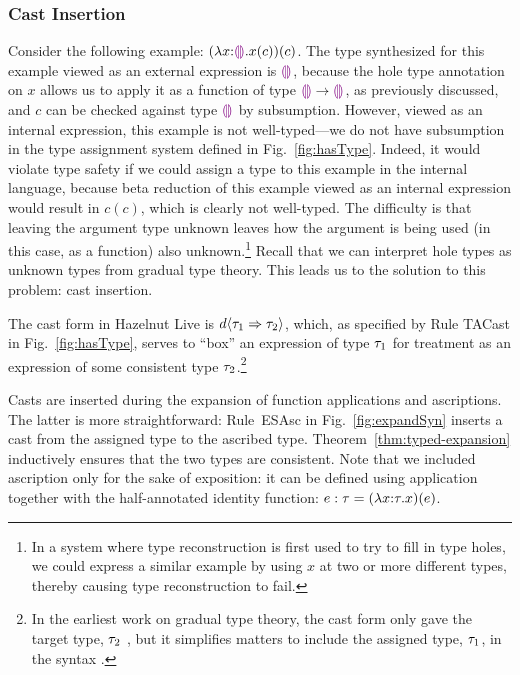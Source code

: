 \subsubsection{Cast Insertion}\label{sec:cast-insertion} 
Consider the following example: $(\lambda x{:}\textcolor{violet}{\llparenthesis}\textcolor{violet}{\rrparenthesis}.x(c))(c)$. The type synthesized for this example viewed as an external expression is $\textcolor{violet}{\llparenthesis}\textcolor{violet}{\rrparenthesis}$, because the hole type annotation on $x$ allows us to apply it as a function of type $\textcolor{violet}{\llparenthesis}\textcolor{violet}{\rrparenthesis} \rightarrow \textcolor{violet}{\llparenthesis}\textcolor{violet}{\rrparenthesis}$, as previously discussed, and $c$ can be checked against type $\textcolor{violet}{\llparenthesis}\textcolor{violet}{\rrparenthesis}$ by subsumption. However, viewed as an internal expression, this example is not well-typed---we do not have subsumption in the type assignment system defined in Fig.~\ref{fig:hasType}. Indeed, it would violate type safety if we could assign a type to this example in the internal language, because beta reduction of this example viewed as an internal expression would result in $c(c)$, which is clearly not well-typed. The difficulty is that leaving the argument type unknown leaves how the argument is being used (in this case, as a function) also unknown.\footnote{In a system where type reconstruction is first used to try to fill in type holes, we could express a similar example by using $x$ at two or more different types, thereby causing type reconstruction to fail.
} Recall that we can interpret hole types as unknown types from gradual type theory. This leads us to the solution to this problem: cast insertion. 

The cast form in Hazelnut Live is $d \langle{\tau_1}\Rightarrow{\tau_2}\rangle$, which, as specified by Rule TACast in Fig.~\ref{fig:hasType}, serves to ``box'' an expression of type $\tau_1$ for treatment as an expression of some consistent type $\tau_2$.\footnote{In the earliest work on gradual type theory, the cast form only gave the target type, $\tau_2$ \cite{Siek06a}, but it simplifies matters to include the assigned type, $\tau_1$, in the syntax \cite{DBLP:conf/snapl/SiekVCB15}.}

Casts are inserted during the expansion of function applications and ascriptions. The latter is more straightforward: Rule~{ESAsc} in Fig.~\ref{fig:expandSyn} inserts a cast from the assigned type to the ascribed  type. Theorem~\ref{thm:typed-expansion} inductively ensures that the two types are consistent.  Note that we included ascription only for the sake of exposition: it can be defined using application together with the half-annotated identity function: $e : \tau = (\lambda x{:}\tau.x)(e)$.

